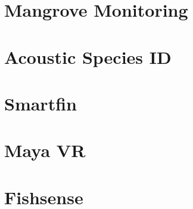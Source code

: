 \section{Mangrove Monitoring}

\section{Acoustic Species ID}

\section{Smartfin}

\section{Maya VR}

\section{Fishsense}
